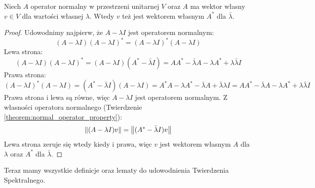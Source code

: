 \begin{lemma}\label{lemma:same_eigenvector}
Niech $A$ operator normalny w przestrzeni unitarnej $V$ oraz $A$ ma wektor własny $v \in V$ dla wartości własnej $\lambda$. Wtedy $v$ też jest wektorem własnym $A^*$ dla $\bar{\lambda}$.
\end{lemma}
\begin{proof}
Udowodnimy najpierw, że $A - \lambda I$ jest operatorem normalnym:
$$(A - \lambda I)(A - \lambda I)^* = (A - \lambda I)^*(A - \lambda I)$$
Lewa strona:
$$(A - \lambda I)(A - \lambda I)^* = (A - \lambda I)(A^* - \bar{\lambda} I) = AA^* - \bar{\lambda}A - \lambda A^* + \lambda\bar{\lambda}I$$
Prawa strona:
$$(A - \lambda I)^*(A - \lambda I) = (A^* - \bar{\lambda} I)(A - \lambda I) = A^*A - \lambda A^* - \bar{\lambda}A + \bar{\lambda} \lambda I = AA^* - \bar{\lambda}A - \lambda A^* + \lambda \bar{\lambda} I$$
Prawa strona i lewa są równe, więc $A - \lambda I$ jest operatorem normalnym. Z własności operatora normalnego (Twierdzenie \ref{theorem:normal_operator_property}):
$$\left\| (A - \lambda I)v \right\| = \left\| (A^* - \bar{\lambda} I)v \right\|$$
Lewa strona zeruje się wtedy kiedy i prawa, więc $v$ jest wektorem własnym $A$ dla $\lambda$ oraz $A^*$ dla $\bar{\lambda}$.
\end{proof}
Teraz mamy wszystkie definicje oraz lematy do udowodnienia Twierdzenia Spektralnego.

